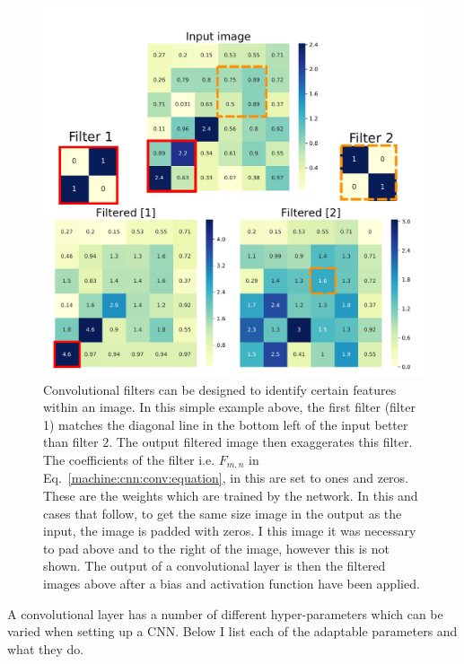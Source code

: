 \begin{figure}[p]

    \centering
    \includegraphics[width=\columnwidth]{C4_cnn/conv_filters.pdf}
    \caption[How convolutions are applied in convolutional neural networks.]{Convolutional filters can be designed to identify certain features within an image. In this simple example above, the first filter (filter 1) matches the diagonal line in the bottom left of the input better than filter 2. The output filtered image then exaggerates this filter. The coefficients of the filter i.e. $F_{m,n}$ in Eq.~\ref{machine:cnn:conv:equation}, in this are set to ones and zeros.
    These are the weights which are trained by the network. In this and cases that follow, to get the same size image in the output as the input, the image is padded with zeros. I this image it was necessary to pad above and to the right of the image, however this is not shown. The output of a convolutional layer is then the filtered images above after a bias and activation function have been applied. }
    \label{machine:cnn:convlayer:input}

\end{figure}

A convolutional layer has a number of different hyper-parameters which can be varied when setting up a \gls{CNN}.
Below I list each of the adaptable parameters and what they do.

